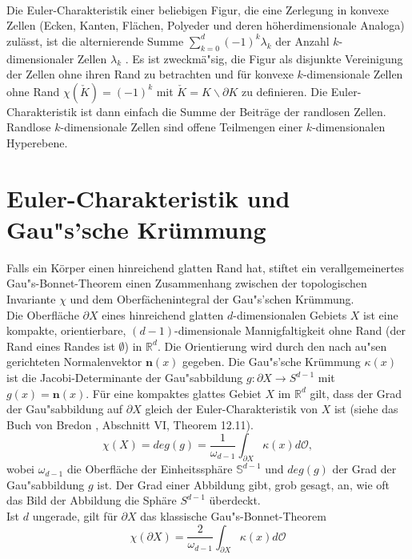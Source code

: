 \\Die Euler-Charakteristik einer beliebigen Figur, die eine Zerlegung in konvexe Zellen (Ecken, Kanten, Fl\"achen, Polyeder und deren h\"oherdimensionale Analoga) zul\"asst, ist die alternierende Summe $\sum_{k=0}^d (-1)^k \lambda_k$ der Anzahl $k$-dimensionaler Zellen $\lambda_k$ \cite{Saskin:89}. Es ist zweckm\"a"sig, die Figur als disjunkte Vereinigung der Zellen ohne ihren Rand zu betrachten und f\"ur konvexe $k$-dimensionale Zellen ohne Rand $\chi(\check{K})=(-1)^k$ mit  $\check{K}=K\backslash \partial K$ zu definieren. Die Euler-Charakteristik ist dann einfach die Summe der Beitr\"age der randlosen Zellen. Randlose $k$-dimensionale Zellen sind offene Teilmengen einer $k$-dimensionalen Hyperebene.


\section{Euler-Charakteristik und Gau"s'sche Kr\"ummung}
\label{sec:Gauss}
Falls ein K\"orper einen hinreichend glatten Rand hat, stiftet ein verallgemeinertes Gau"s-Bonnet-Theorem einen Zusammenhang zwischen der topologischen Invariante $\chi$ und dem Oberf\"achenintegral der Gau"s'schen Kr\"ummung. 
\\Die Oberfl\"ache $\partial X$ eines hinreichend glatten $d$-dimensionalen Gebiets $X$ ist eine kompakte, orientierbare, $(d-1)$-dimensionale Mannigfaltigkeit ohne Rand (der Rand eines Randes ist $\emptyset$) in $\mathbb{R}^d$. Die Orientierung wird durch den nach au"sen gerichteten Normalenvektor $\mathbf{n}(x)$ gegeben. Die Gau"s'sche Kr\"ummung $\kappa(x)$ ist die Jacobi-Determinante der Gau"sabbildung $g:\partial X \rightarrow S^{d-1}$ mit $g(x)=\mathbf{n}(x)$. F\"ur eine kompaktes glattes Gebiet $X$ im $\mathbb{R}^d$ gilt, dass der Grad der Gau"sabbildung auf $\partial X$ gleich der Euler-Charakteristik von $X$ ist (siehe das Buch von Bredon  \cite{Bredon:93}, Abschnitt VI, Theorem 12.11). 
\begin{equation}
  \label{eq:curvature}
 \chi(X)=deg(g)=\frac{1}{\omega_{d-1}}\int_{\partial X} \kappa(x) d\mathcal{O},
\end{equation}
wobei $\omega_{d-1}$ die Oberfl\"ache der Einheitssph\"are $\mathbb{S}^{d-1}$ und $deg(g)$ der Grad der Gau"sabbildung $g$ ist. Der Grad einer Abbildung gibt, grob gesagt, an, wie oft das Bild der Abbildung die Sph\"are $S^{d-1}$ \"uberdeckt. \\
Ist $d$ ungerade, gilt f\"ur $\partial X$ das klassische Gau"s-Bonnet-Theorem    
\begin{equation}
  \chi(\partial X)=\frac{2}{\omega_{d-1}}\int_{\partial X} \kappa(x) d\mathcal{O}
\end{equation}

